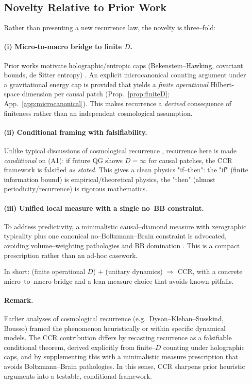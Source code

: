 \documentclass[12pt]{article}
\theoremstyle{remark}
\begin{document}
\subsection{Novelty Relative to Prior Work}
\label{subsec:novelty}
Rather than presenting a new recurrence law, the novelty is three–fold:

\paragraph{(i) Micro-to-macro bridge to finite $D$.}
Prior works motivate holographic/entropic caps (Bekenstein–Hawking, covariant bounds, de Sitter entropy) \cite{Bekenstein1973,Hawking1975,Bousso1999}.
An explicit microcanonical counting argument under a gravitational energy cap is provided that yields a \emph{finite operational} Hilbert-space dimension per causal patch (Prop.~\ref{prop:finiteD}; App.~\ref{app:microcanonical}).
This makes recurrence a \emph{derived} consequence of finiteness rather than an independent cosmological assumption.

\paragraph{(ii) Conditional framing with falsifiability.}
Unlike typical discussions of cosmological recurrence \cite{DysonKlebanSusskind2002}, recurrence here is made \emph{conditional} on (A1): if future QG shows $D=\infty$ for causal patches, the CCR framework is falsified \emph{as stated}. 
This gives a clean physics "if–then": the "if" (finite information bound) is empirical/theoretical physics, the "then" (almost periodicity/recurrence) is rigorous mathematics.

\paragraph{(iii) Unified local measure with a single no–BB constraint.}
To address predictivity, a minimalistic causal–diamond measure with xerographic typicality plus one canonical no–Boltzmann–Brain constraint is advocated, avoiding volume–weighting pathologies and BB domination \cite{DysonKlebanSusskind2002,Page2007}.
This is a compact prescription rather than an ad-hoc casework.

\noindent In short: (finite operational $D$) $+$ (unitary dynamics) $\Rightarrow$ CCR, with a concrete micro–to–macro bridge and a lean measure choice that avoids known pitfalls.

\paragraph{Remark.}
Earlier analyses of cosmological recurrence (e.g.\ Dyson--Kleban--Susskind, Bousso)
framed the phenomenon heuristically or within specific dynamical models.
The CCR contribution differs by recasting recurrence as a falsifiable conditional
theorem, derived explicitly from finite--$D$ counting under holographic caps,
and by supplementing this with a minimalistic measure prescription that
avoids Boltzmann--Brain pathologies. In this sense, CCR sharpens prior
heuristic arguments into a testable, conditional framework.
\end{document}
